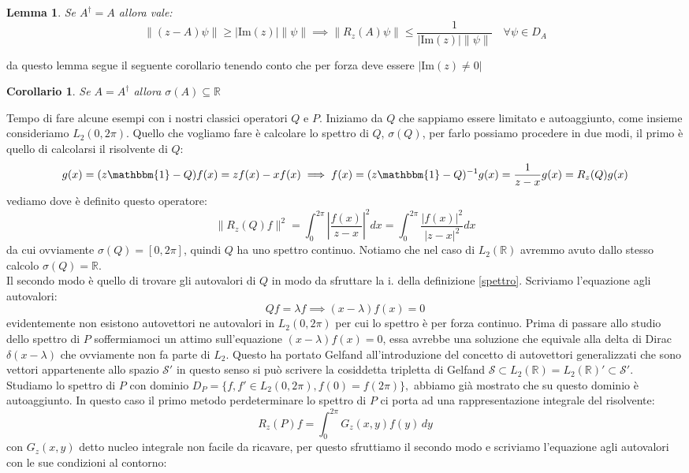 \documentclass[12pt]{book}
\theoremstyle{plain}
\newcommand{\R}{\mathbb{R}}
\newtheorem{coro}[thm]{Corollario}
\newtheorem{lem}[thm]{Lemma}
\theoremstyle{definition}
\theoremstyle{remark}
\begin{document}
\begin{lem}
Se $A^\dagger = A$ allora vale:
\[\|(z-A)\psi\|\geq |\text{Im}(z)|\|\psi\|\implies \|R_z(A)\psi\|\leq \frac{1}{|\text{Im}(z)|\|\psi\|} \quad\forall\psi\in D_A\]
\end{lem}
da questo lemma segue il seguente corollario tenendo conto che per forza deve essere $|\text{Im}(z)\neq 0|$
\begin{coro}
Se $A=A^\dagger$ allora $\sigma(A)\subseteq \R$
\end{coro}
Tempo di fare alcune esempi con i nostri classici operatori $Q$ e $P$. Iniziamo da $Q$ che sappiamo essere limitato e autoaggiunto, come insieme consideriamo $L_2(0,2\pi)$. Quello che vogliamo fare è calcolare lo spettro di $Q$, $\sigma(Q)$, per farlo possiamo procedere in due modi, il primo è quello di calcolarsi il risolvente di $Q$:
\[g(x) = (z\mathbbm{1} -Q)f(x) = zf(x) - xf(x) \implies f(x) = (z\mathbbm{1} -Q)^{-1}g(x) = \frac{1}{z-x}g(x) = R_z(Q)g(x)   \]
vediamo dove è definito questo operatore:
\[\|R_z(Q)f\|^2 = \int_0^{2\pi}\left|\frac{f(x)}{z-x}\right|^2dx =\int_0^{2\pi}\frac{|f(x)|^2}{|z-x|^2}dx \]
da cui ovviamente $\sigma(Q) = [0,2\pi]$, quindi $Q$ ha uno spettro continuo. Notiamo che nel caso di $L_2(\R)$ avremmo avuto dallo stesso calcolo $\sigma(Q) = \R$.\\
Il secondo modo è quello di trovare gli autovalori di $Q$ in modo da sfruttare la i. della definizione \eqref{spettro}. Scriviamo l'equazione agli autovalori:
\[Qf = \lambda f \implies (x-\lambda)f(x) = 0\]
evidentemente non esistono autovettori ne autovalori in $L_2(0,2\pi)$ per cui lo spettro è per forza continuo. Prima di passare allo studio dello spettro di $P$ soffermiamoci un attimo sull'equazione $(x-\lambda)f(x) = 0$, essa avrebbe una soluzione che equivale alla delta di Dirac $\delta(x-\lambda)$ che ovviamente non fa parte di $L_2$. Questo ha portato Gelfand all'introduzione del concetto di autovettori generalizzati che sono vettori appartenente allo spazio $\mathcal{S}'$ in questo senso si può scrivere la cosiddetta tripletta di Gelfand $\mathcal{S}\subset L_2(\R) = L_2(\R)' \subset \mathcal{S}'$.\\
Studiamo lo spettro di $P$ con dominio $D_P=\{f,f'\in L_2(0,2\pi),f(0) = f(2\pi)\},$ abbiamo già mostrato che su questo dominio è autoaggiunto. In questo caso il primo metodo perdeterminare lo spettro di $P$ ci porta ad una rappresentazione integrale del risolvente:
\[R_z(P)f = \int_0^{2\pi}G_z(x,y)f(y)\,dy\]
con $G_z(x,y)$ detto nucleo integrale non facile da ricavare, per questo sfruttiamo il secondo modo e scriviamo l'equazione agli autovalori con le sue condizioni al contorno:
\end{document}
